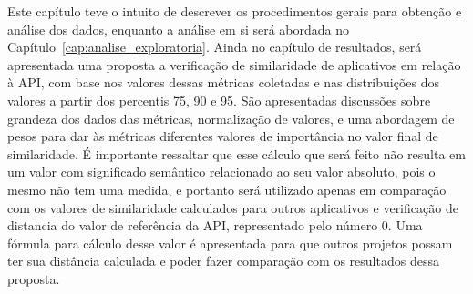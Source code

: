 Este capítulo teve o intuito de descrever os procedimentos gerais para obtenção e análise dos dados, enquanto a análise em si será abordada no Capítulo~\ref{cap:analise_exploratoria}. Ainda no capítulo de resultados, será apresentada uma proposta a verificação de similaridade de aplicativos em relação à API, com base nos valores dessas métricas coletadas e nas distribuições dos valores a partir dos percentis 75, 90 e 95. São apresentadas discussões sobre grandeza dos dados das métricas, normalização de valores, e uma abordagem de pesos para dar às métricas diferentes valores de importância no valor final de similaridade. É importante ressaltar que esse cálculo que será feito não resulta em um valor com significado semântico relacionado ao seu valor absoluto, pois o mesmo não tem uma medida, e portanto será utilizado apenas em comparação com os valores de similaridade calculados para outros aplicativos e verificação de distancia do valor de referência da API, representado pelo número 0. Uma fórmula para cálculo desse valor é apresentada para que outros projetos possam ter sua distância calculada e poder fazer comparação com os resultados dessa proposta.
